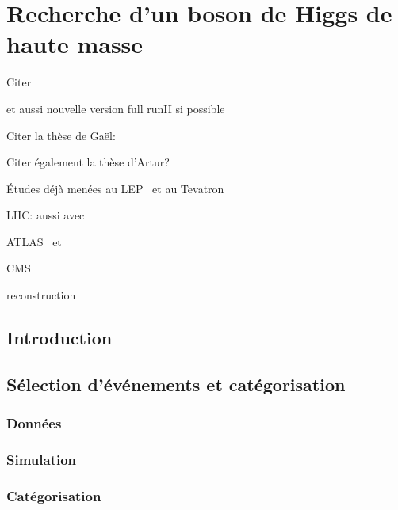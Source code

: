 \chapter{Recherche d'un boson de Higgs de haute masse}\label{chapter-HTT_analysis}

Citer 

et aussi nouvelle version full runII si possible


Citer la thèse de Gaël:\\

Citer également la thèse d'Artur?\\


Études déjà menées au LEP~\cite{Schael:2006cr} et au Tevatron~\cite{Aaltonen:2009vf,Abazov:2011jh}

LHC: aussi avec \quarkb\antiquarkb~\cite{Chatrchyan:2013qga,Khachatryan:2015tra}

ATLAS \mu\mu\ et \tau\tau~\cite{Aad:2012cfr,ATLAS-MSSM-HTT_2018}

CMS \mu\mu~\cite{CMS:2015ooa} \tau\tau~\cite{Chatrchyan:2012vp,CMS-MSSM-HTT_2014,CMS-PAS-HIG-17-020}

reconstruction \tauh~\cite{Khachatryan:2015dfa}

\section{Introduction}\label{chapter-HTT_analysis-section-introduction}

\section{Sélection d'événements et catégorisation}\label{chapter-HTT_analysis-section-evt_selection}
\subsection{Données}\label{chapter-HTT_analysis-section-evt_selection-subsec-data}
\subsection{Simulation}\label{chapter-HTT_analysis-section-evt_selection-subsec-MC}
\subsection{Catégorisation}\label{chapter-HTT_analysis-section-evt_selection-subsec-categorisation}

